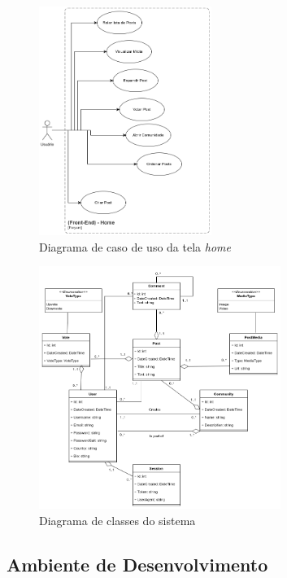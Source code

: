 \documentclass[12pt]{article}
\begin{document}
\begin{figure}[H]
    \centering
    \includegraphics[width=0.5\textwidth]{diagrams/home_diagram.png}
    \caption{Diagrama de caso de uso da tela \textit{home}}\label{fig:home_diagram}
\end{figure}


\begin{figure}[H]
    \centering
    \includegraphics[width=0.7\textwidth]{diagrams/classes_diagram.png}
    \caption{Diagrama de classes do sistema}\label{fig:classes_diagram}
\end{figure}



\subsection{Ambiente de Desenvolvimento}
\end{document}
